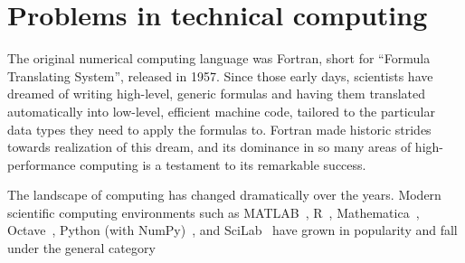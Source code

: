 \chapter{Problems in technical computing}

The original numerical computing language was Fortran, short for
``Formula Translating System'', released in 1957.  Since those
early days, scientists have dreamed of writing high-level, generic
formulas and having them translated automatically into low-level,
efficient machine code, tailored to the particular data types they
need to apply the formulas to.  Fortran made historic strides towards
realization of this dream, and its dominance in so many areas of
high-performance computing is a testament to its remarkable success.

The landscape of computing has changed dramatically over the years.
Modern scientific
computing environments such as MATLAB~\cite{matlab}, R~\cite{Rlang},
Mathematica~\cite{mathematica}, Octave~\cite{Octave},
Python (with NumPy)~\cite{numpy}, and SciLab~\cite{scilab} have grown in popularity
and fall under the general category
